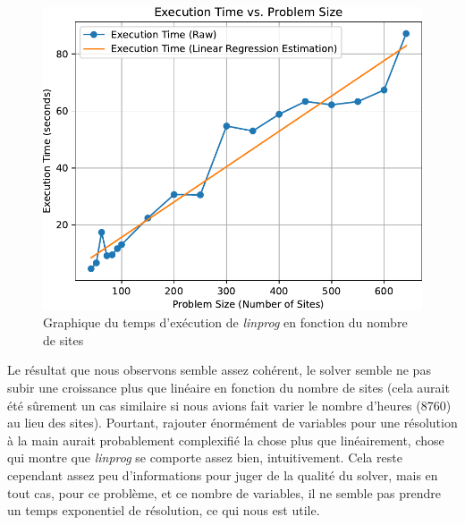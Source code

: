 \documentclass{article}
\newlength{\temp}
\begin{document}
\begin{figure}[h!]
    \centering
    \includegraphics[scale=0.5]{Images/Partie_1/Q3/execution_time_vs_problem_size.pdf}
    \caption{Graphique du temps d'exécution de \textit{linprog} en fonction du nombre de sites}
    \label{fig:execution_time_vs_problem_size_Q3}
\end{figure}
\newpage
Le résultat que nous observons semble assez cohérent, le solver semble ne pas subir une croissance plus que linéaire en fonction du nombre de sites (cela aurait été sûrement un cas similaire si nous avions fait varier le nombre d'heures (8760) au lieu des sites). Pourtant, rajouter énormément de variables pour une résolution à la main aurait probablement complexifié la chose plus que linéairement, chose qui montre que \textit{linprog} se comporte assez bien, intuitivement. Cela reste cependant assez peu d'informations pour juger de la qualité du solver, mais en tout cas, pour ce problème, et ce nombre de variables, il ne semble pas prendre un temps exponentiel de résolution, ce qui nous est utile.
\end{document}
